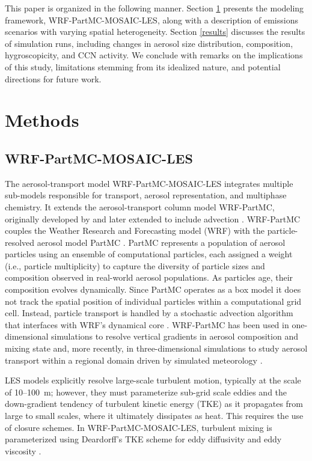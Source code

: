 \documentclass[acp, manuscript]{copernicus}
\begin{document}
This paper is organized in the following manner. Section \ref{methods}
presents the modeling framework, WRF-PartMC-MOSAIC-LES, along with a
description of emissions scenarios with varying spatial
heterogeneity. Section \ref{results} discusses the results of simulation runs,
including changes in aerosol size distribution, composition,
hygroscopicity, and CCN activity. We conclude with remarks on the
implications of this study, limitations stemming from its idealized
nature, and potential directions for future work.

\section{Methods}\label{methods}

\subsection{WRF-PartMC-MOSAIC-LES}

The aerosol-transport model WRF-PartMC-MOSAIC-LES integrates multiple
sub-models responsible for transport, aerosol representation, and
multiphase chemistry. It extends the aerosol-transport column model
WRF-PartMC, originally developed by \citet{curtis_single-column_2017}
and later extended to include advection
\citep{gmd-17-8399-2024}. WRF-PartMC couples the Weather Research and
Forecasting model (WRF) \citep{skamarock_description_2008} with the
particle-resolved aerosol model PartMC
\citep{riemer_simulating_2009}. PartMC represents a population of
aerosol particles using an ensemble of computational particles, each
assigned a weight (i.e., particle multiplicity) to capture the
diversity of particle sizes and composition observed in real-world
aerosol populations. As particles age, their composition evolves
dynamically. Since PartMC operates as a box model it does not track
the spatial position of individual particles within a computational
grid cell. Instead, particle transport is handled by a stochastic
advection algorithm that interfaces with WRF's dynamical core
\citep{gmd-17-8399-2024}. WRF-PartMC has been used in one-dimensional
simulations to resolve vertical gradients in aerosol composition and
mixing state \citep {curtis_single-column_2017} and, more recently, in
three-dimensional simulations to study aerosol transport within a
regional domain driven by simulated meteorology
\citep{gmd-17-8399-2024}.

LES models explicitly resolve large-scale turbulent motion, typically
at the scale of 10--100~m; however, they must parameterize sub-grid
scale eddies and the down-gradient tendency of turbulent kinetic
energy (TKE) as it propagates from large to small scales, where it
ultimately dissipates as heat. This requires the use of closure
schemes. In WRF-PartMC-MOSAIC-LES, turbulent mixing is parameterized
using Deardorff's TKE scheme for eddy diffusivity and eddy viscosity
\citep{deardorff_stratocumulus-capped_1980}.
\end{document}
